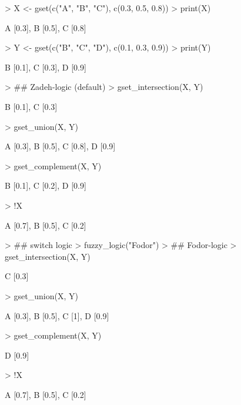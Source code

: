 \documentclass[fleqn]{article}
\begin{document}
\begin{Schunk}
\begin{Sinput}
> X <- gset(c("A", "B", "C"), c(0.3, 0.5, 0.8))
> print(X)
\end{Sinput}
\begin{Soutput}
{A [0.3], B [0.5], C [0.8]}
\end{Soutput}
\begin{Sinput}
> Y <- gset(c("B", "C", "D"), c(0.1, 0.3, 0.9))
> print(Y)
\end{Sinput}
\begin{Soutput}
{B [0.1], C [0.3], D [0.9]}
\end{Soutput}
\begin{Sinput}
> ## Zadeh-logic (default)
> gset_intersection(X, Y)
\end{Sinput}
\begin{Soutput}
{B [0.1], C [0.3]}
\end{Soutput}
\begin{Sinput}
> gset_union(X, Y)
\end{Sinput}
\begin{Soutput}
{A [0.3], B [0.5], C [0.8], D [0.9]}
\end{Soutput}
\begin{Sinput}
> gset_complement(X, Y)
\end{Sinput}
\begin{Soutput}
{B [0.1], C [0.2], D [0.9]}
\end{Soutput}
\begin{Sinput}
> !X
\end{Sinput}
\begin{Soutput}
{A [0.7], B [0.5], C [0.2]}
\end{Soutput}
\begin{Sinput}
> ## switch logic
> fuzzy_logic("Fodor")
> ## Fodor-logic
> gset_intersection(X, Y)
\end{Sinput}
\begin{Soutput}
{C [0.3]}
\end{Soutput}
\begin{Sinput}
> gset_union(X, Y)
\end{Sinput}
\begin{Soutput}
{A [0.3], B [0.5], C [1], D [0.9]}
\end{Soutput}
\begin{Sinput}
> gset_complement(X, Y)
\end{Sinput}
\begin{Soutput}
{D [0.9]}
\end{Soutput}
\begin{Sinput}
> !X
\end{Sinput}
\begin{Soutput}
{A [0.7], B [0.5], C [0.2]}
\end{Soutput}
\end{Schunk}
\end{document}
